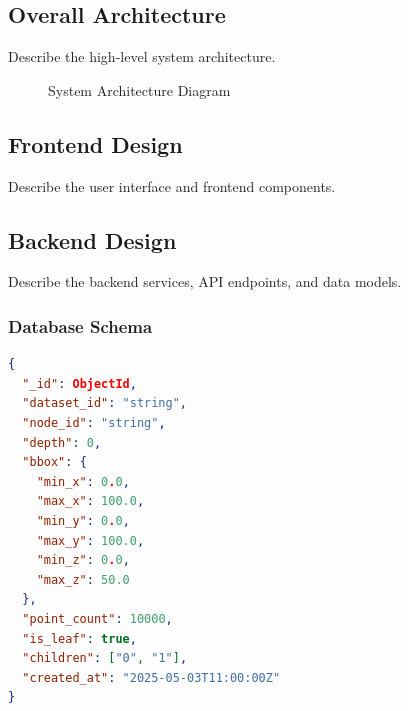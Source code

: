 \documentclass[12pt,a4paper,onecolumn,oneside]{report}
\begin{document}
\subsection{Overall Architecture}
\label{sec:design:overall}

Describe the high-level system architecture.

\begin{figure}[h]
    \centering
    \caption{System Architecture Diagram}
    \label{fig:architecture}
\end{figure}

\subsection{Frontend Design}
\label{sec:design:frontend}

Describe the user interface and frontend components.

\subsection{Backend Design}
\label{sec:design:backend}

Describe the backend services, API endpoints, and data models.

\subsubsection{Database Schema}
\label{sec:design:schema}

\begin{lstlisting}[language=json, caption=Sample Database Schema, label=lst:schema]
{
  "_id": ObjectId,
  "dataset_id": "string",
  "node_id": "string",
  "depth": 0,
  "bbox": {
    "min_x": 0.0,
    "max_x": 100.0,
    "min_y": 0.0,
    "max_y": 100.0,
    "min_z": 0.0,
    "max_z": 50.0
  },
  "point_count": 10000,
  "is_leaf": true,
  "children": ["0", "1"],
  "created_at": "2025-05-03T11:00:00Z"
}
\end{lstlisting}
\end{document}
